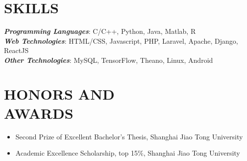 \documentclass[line,margin]{res}
\begin{document}
\begin{resume}
\section{SKILLS}
            {\sl \textbf{Programming Languages}}: C/C++, Python, Java, Matlab, R\\
            {\sl \textbf{Web Technologies}}: HTML/CSS, Javascript, PHP, Laravel, Apache, Django, ReactJS\\
            {\sl \textbf{Other Technologies}}: MySQL, TensorFlow, Theano, Linux, Android\\
\vspace{-2.5mm}
\section{HONORS AND \\ AWARDS }
        \begin{itemize}
        \item Second Prize of Excellent Bachelor's Thesis, Shanghai Jiao Tong University
        \item Academic Excellence Scholarship, top 15\%, Shanghai Jiao Tong University
        \end{itemize}
\end{resume}
\end{document}
